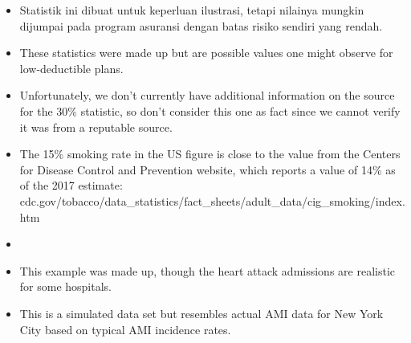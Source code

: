 \begin{itemize}
\item[\ref{geomDist}]
    Statistik ini dibuat untuk keperluan ilustrasi, tetapi nilainya mungkin
    dijumpai pada program asuransi dengan batas risiko sendiri yang rendah.


\item[\ref{binomialModel}]
    These statistics were made up but are possible
    values one might observe for low-deductible plans.
\item[\ref{binomialModel}]
    Unfortunately, we don't currently have additional
    information on the source for the 30\% statistic,
    so don't consider this one as fact since we cannot
    verify it was from a reputable source.    
\item[\ref{binomialModel}]
    The 15\% smoking rate in the US figure is close to
    the value from the Centers for Disease Control and
    Prevention website, which reports a value of 14\%
    as of the 2017 estimate: \\
        {cdc.gov/tobacco/data\_statistics/fact\_sheets/adult\_data/cig\_smoking/index.htm}

\item[\ref{negativeBinomial}]
    \madeup{}
\item[\ref{negativeBinomial}]
    This example was made up, though the heart attack
    admissions are realistic for some hospitals.

\item[\ref{poisson}]
    This is a simulated data set but resembles actual
    AMI data for New York City based on typical AMI
    incidence rates.
\end{itemize}








\section{}
\label{ch_foundations_for_inf_data}

